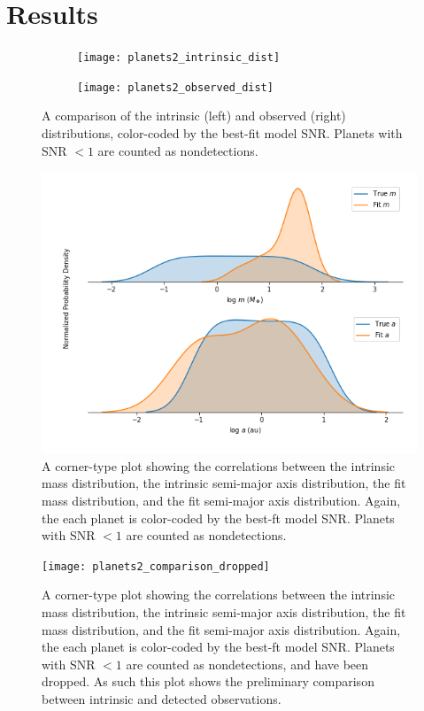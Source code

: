 \documentclass[12pt,manuscript]{aastex}
\begin{document}
\section{Results}
\label{section: results}

\begin{figure}[h]
  \centering
  
  \begin{subfigure}[b]{.45\linewidth}
  \texttt{[image: planets2\_intrinsic\_dist]}
  \end{subfigure}
  \begin{subfigure}[b]{.45\linewidth}
  \texttt{[image: planets2\_observed\_dist]}
  \end{subfigure}
  \caption{A comparison of the intrinsic (left) and observed (right) distributions, color-coded by the best-fit model SNR. Planets with SNR $< 1$ are counted as nondetections.}
  \label{}
\end{figure}

\begin{figure}[h]
  \centering
  \includegraphics[width=0.9\linewidth]{planets2_comparison}
  \caption{A corner-type plot showing the correlations between the intrinsic mass distribution, the intrinsic semi-major axis distribution, the fit mass distribution, and the fit semi-major axis distribution. Again, the each planet is color-coded by the best-ft model SNR. Planets with SNR $< 1$ are counted as nondetections.}
  \label{}
\end{figure}

\begin{figure}[h]
  \centering
  \texttt{[image: planets2\_comparison\_dropped]}
  \caption{A corner-type plot showing the correlations between the intrinsic mass distribution, the intrinsic semi-major axis distribution, the fit mass distribution, and the fit semi-major axis distribution. Again, the each planet is color-coded by the best-ft model SNR. Planets with SNR $< 1$ are counted as nondetections, and have been dropped. As such this plot shows the preliminary comparison between intrinsic and detected observations.}
  \label{}
\end{figure}
\end{document}
